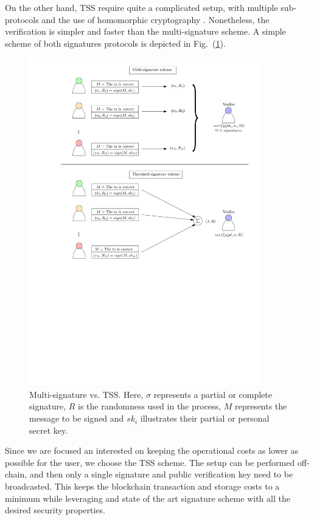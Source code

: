 On the other hand, TSS  require quite a complicated setup, with multiple sub-protocols and the use of homomorphic cryptography \cite{Moore2014PracticalSurvey}. Nonetheless, the verification is simpler and faster than the multi-signature scheme. A simple scheme of both signatures protocols is depicted in Fig.~(\ref{fig:signatures}).

\begin{figure}[H]
    \centering
    \includegraphics[width=0.9\textwidth]{images/mosaic/phase3/signatures.pdf}
    \caption{Multi-signature vs. TSS. Here, $\sigma$ represents a partial or complete signature, $R$ is the randomness used in the process, $M$ represents the message to be signed and $sk_i$ illustrates their partial or personal secret key.}
    \label{fig:signatures}
\end{figure}


Since we are focused an interested on keeping the operational costs as lower as possible for the user, we choose the TSS scheme. The setup can be performed off-chain, and then only a single signature and public verification key need to be broadcasted. This keeps the blockchain transaction and storage costs to a minimum while leveraging and state of the art signature scheme with all the desired security properties.


